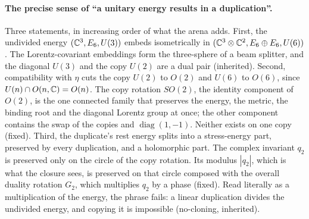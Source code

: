 \paragraph{The precise sense of ``a unitary energy results in a duplication''.} Three statements, in increasing order of what the arena adds.
First, the undivided energy $(\mathbb{C}^3,E_6,U(3))$ embeds isometrically in $(\mathbb{C}^3\otimes\mathbb{C}^2,E_6\oplus E_6,U(6))$. The Lorentz-covariant embeddings
form the three-sphere of a beam splitter, and the diagonal $U(3)$ and the copy $U(2)$ are a dual pair (inherited). Second, compatibility with
$\eta$ cuts the copy $U(2)$ to $O(2)$ and $U(6)$ to $O(6)$, since $U(n)\cap O(n,\mathbb{C})=O(n)$. The copy rotation $SO(2)$, the identity component of
$O(2)$, is the one connected family that preserves the energy, the metric, the binding root and the diagonal Lorentz group at once; the other
component contains the swap of the copies and $\operatorname{diag}(1,-1)$. Neither exists on one copy (fixed). Third, the duplicate's rest
energy splits into a stress-energy part, preserved by every duplication, and a holomorphic part. The complex invariant $q_2$ is preserved only on the circle of the copy rotation. Its modulus $|q_2|$, which is what
the closure sees, is preserved on that circle composed with the overall duality rotation $G_2$, which multiplies $q_2$ by a phase (fixed). Read literally as a multiplication of the energy, the phrase fails: a linear duplication divides the
undivided energy, and copying it is impossible (no-cloning, inherited).


